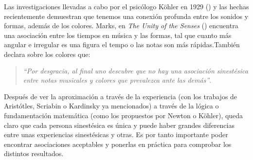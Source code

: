 Las investigaciones llevadas a cabo por el psicólogo Köhler en 1929 (\cite{GestaltPsychology}) y las hechas recientemente demuestran que tenemos una conexión profunda entre los sonidos y formas, además de los colores. Marks, en \emph{The Unity of the Senses} (\cite{TheUnityOfTheSenses}) encuentra una asociación entre los tiempos en música y las formas, tal que cuanto más angular e irregular es una figura el tempo o las notas son más rápidas.También declara sobre los colores que:
\begin{quote}
\emph{``Por desgracia, al final uno descubre que no hay una asociación sinestésica entre notas musicales y colores que prevalezca ante las demás''}.\\
\end{quote}

Después de ver la aproximación a través de la experiencia (con los trabajos de Aristótles, Scriabin o Kardinsky ya mencionados) a través de la lógica o fundamentación matemática (como los propuestos por Newton o Köhler), queda claro que cada persona sinestésica es única y puede haber grandes diferencias entre unas experiencias sinestésicas y otras. Es por tanto importante poder encontrar asociaciones aceptables y ponerlas en práctica para comprobar los distintos resultados.